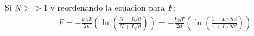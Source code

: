 \begin{answer}
    Si $N>>1$ y reordenando la ecuacion para $F$:
    \begin{align*}
        F = -\frac{k_B T}{2d} \left(
            \ln\left(\frac{N - L/d}{N + L/d}\right)
        \right)= -\frac{k_B T}{2d} \left(
            \ln\left(\frac{1 - L/Nd}{1 + L/Nd}\right)
        \right) 
    \end{align*}
\end{answer}